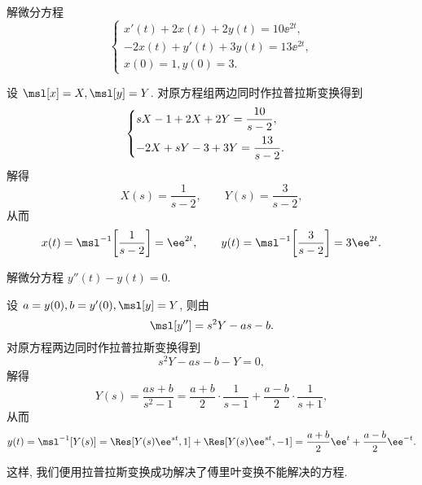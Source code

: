\begin{example}
  解微分方程
  \[
    \begin{cases}
      x'(t)+2x(t)+2y(t)=10\ee^{2t}, \\
      -2x(t)+y'(t)+3y(t)=13\ee^{2t}, \\
      x(0)=1,y(0)=3.
    \end{cases}
  \]
\end{example}

\begin{solution}
  设 $\msl[x]=X,\msl[y]=Y$.
  对原方程组两边同时作拉普拉斯变换得到
  \[
    \begin{cases}
      sX-1+2X+2Y=\dfrac{10}{s-2},\\[2\itemsep]
      -2X+sY-3+3Y=\dfrac{13}{s-2}.
    \end{cases}
  \]
  解得
  \[
    X(s)=\frac1{s-2},\qquad 
    Y(s)=\frac3{s-2},
  \]
  从而
  \[
     x(t)
    =\msl^{-1}\biggl[\frac1{s-2}\biggr]
    =\ee^{2t},\qquad
     y(t)
    =\msl^{-1}\biggl[\frac3{s-2}\biggr]
    =3\ee^{2t}.
  \]
\end{solution}

\begin{example}
  解微分方程 $y''(t)-y(t)=0$.
\end{example}

\begin{solution}
  设 $a=y(0),b=y'(0),\msl[y]=Y$, 则由\thmLDif
  \[
    \msl[y'']=s^2Y-as-b.
  \]
  对原方程两边同时作拉普拉斯变换得到
  \[
    s^2Y-as-b-Y=0,
  \]
  解得
  \[
     Y(s)
    =\frac{as+b}{s^2-1}
    =\frac{a+b}2\cdot\frac1{s-1}+\frac{a-b}2\cdot\frac1{s+1},
  \]
  从而
  \[
     y(t)
    =\msl^{-1}[Y(s)]
    =\Res[Y(s)\ee^{st},1]+\Res[Y(s)\ee^{st},-1]
    =\frac{a+b}2\ee^t+\frac{a-b}2\ee^{-t}.
  \]
\end{solution}

这样, 我们便用拉普拉斯变换成功解决了傅里叶变换不能解决的方程.


\newpage
{}

